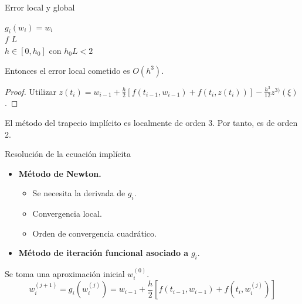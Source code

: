 		
		\begin{frame}{Error local y global}
			\fontsize{11}{12}\selectfont
			\begin{proposition} \label{prop:implicito:error}
				\begin{cases}
					$g_i(w_i) = w_i$ \\
					$f$  $L$  \\
					$h \in [0, h_0]$ con $h_0L< 2$
				\end{cases}
				Entonces el error local cometido es $O(h^3)$.
			\end{proposition}
			\begin{proof}
				Utilizar $z(t_{i}) = w_{i-1} + \frac{h}{2} \left[f(t_{i-1},w_{i-1}) + f(t_i, z(t_i))\right] - \frac{h^3}{12}z^{3)}(\xi)$.
			\end{proof}
			
			\begin{corollary}
				El método del trapecio implícito es localmente de orden 3. Por tanto, es de orden 2.
			\end{corollary}
		\end{frame}
		
		\begin{frame}{Resolución de la ecuación implícita}
			\begin{itemize}
				\item \textbf{Método de Newton.} 
					\begin{itemize}
						\item Se necesita la derivada de $g_i$. 
						\item Convergencia local. 
						\item Orden de convergencia cuadrático.
					\end{itemize}
				\item \textbf{Método de iteración funcional asociado a } $g_i$.
			\end{itemize}
			
			\begin{definition}
				Se toma una aproximación inicial $w_i^{(0)}$.
				\begin{equation} \label{eq:ti-def}
					w_{i} ^{(j+1)} = g_i(w_i^{(j)}) = w_{i-1} + \frac{h}{2} \left[f(t_{i-1}, w_{i-1}) + f(t_i, w_{i}^{(j)})\right]
				\end{equation}
			\end{definition}
		\end{frame}
		

